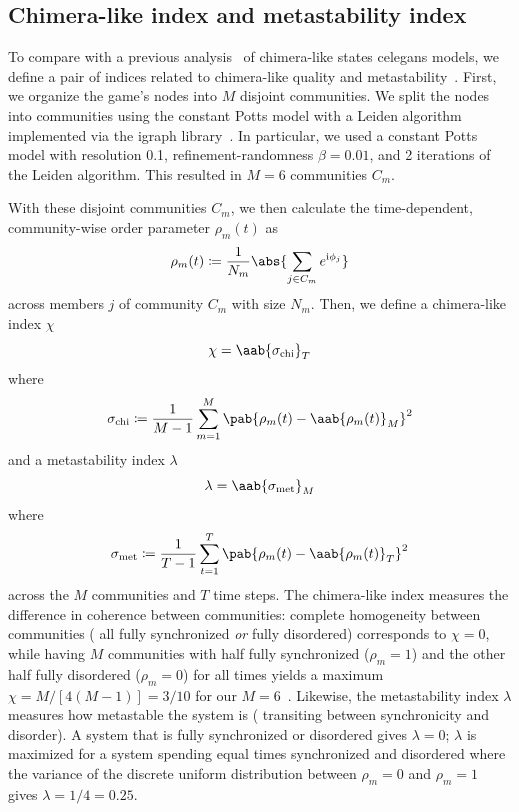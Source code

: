 \documentclass[10pt,letterpaper]{article}
\begin{document}
\subsection{Chimera-like index and metastability index}\label{sec:chimera-metastability-def}
To compare with a previous analysis~\cite{hizanidis2016chimera} of
chimera-like states \gls{celegans} models,
we define a pair of indices related to
chimera-like quality and metastability~\cite{shanahan2010metastable}.
First, we organize the game's nodes
into $M$ disjoint communities.
We split the nodes into communities
using the constant Potts model with a Leiden algorithm
implemented via the igraph library~\cite{csardi2006igraph}.
In particular, we used a constant Potts model
with resolution \num{0.1},
refinement-randomness $\beta = \num{0.01}$,
and \num{2} iterations of the Leiden algorithm.
This resulted in $M=6$ communities $C_m$.

With these disjoint communities $C_m$, we then calculate
the time-dependent, community-wise order parameter $\rho_m(t)$
as
\begin{equation}
  \rho_m(t) \coloneqq \frac{1}{N_m} \abs{\sum_{j \in C_m} e^{\im \phi_j}}
  \label{eq:order_parameter_community}
\end{equation}
across members $j$ of community $C_m$ with size $N_m$.
Then, we define a chimera-like index $\chi$
\begin{equation}
  \chi = \aab{
    \sigma_{\text{chi}}}_T
  \label{eq:chimera_index}
\end{equation}
where
\begin{equation*}
    \sigma_{\text{chi}} \coloneqq \frac{1}{M-1} \sum_{m=1}^M
    \pab{\rho_m(t) - \aab{\rho_m(t)}_M}^2
\end{equation*}
and a metastability index $\lambda$
\begin{equation}
  \lambda = \aab{
    \sigma_{\text{met}}}_M
  \label{eq:metastability_index}
\end{equation}
where
\begin{equation*}
    \sigma_{\text{met}} \coloneqq \frac{1}{T-1} \sum_{t=1}^T
    \pab{\rho_m(t) - \aab{\rho_m(t)}_T}^2
\end{equation*}
across the $M$ communities and $T$ time steps.
The chimera-like index measures the difference in coherence between communities:
complete homogeneity between communities
(\eg{} all fully synchronized \emph{or} fully disordered)
corresponds to $\chi = 0$,
while having $M$ communities
with half fully synchronized ($\rho_m = 1$)
and the other half fully disordered ($\rho_m = 0$)
for all times yields a maximum $\chi = M/[4(M-1)]
= 3/10$ for our $M=6$~\cite{shanahan2010metastable}.
Likewise, the metastability index $\lambda$ measures how metastable
the system is (\ie{} transiting between synchronicity and disorder).
A system that is fully synchronized or disordered gives $\lambda = 0$;
$\lambda$ is maximized for a system spending equal times synchronized
and disordered
where the variance of the discrete uniform distribution
between $\rho_m = 0$ and $\rho_m = 1$ gives
$\lambda = 1/4 = \num{0.25}$.
\end{document}
